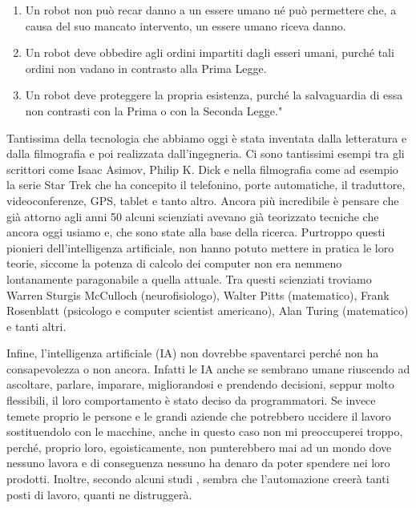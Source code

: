 \documentclass[12pt]{book} %
\begin{document}
\begin{enumerate}
\item Un robot non può recar danno a un essere umano né può permettere che, a causa del suo mancato intervento, un
essere umano riceva danno.
\item Un robot deve obbedire agli ordini impartiti dagli esseri umani, purché tali ordini non vadano in contrasto alla
Prima Legge.
\item Un robot deve proteggere la propria esistenza, purché la salvaguardia di essa non contrasti con la Prima o con la
Seconda Legge."
\end{enumerate}
Tantissima della tecnologia che abbiamo oggi è stata inventata dalla letteratura e dalla filmografia e poi realizzata
dall'ingegneria. Ci sono tantissimi esempi tra gli scrittori come Isaac Asimov, Philip K. Dick e
nella filmografia come ad esempio la serie Star Trek che ha concepito il telefonino, porte automatiche, il traduttore,
videoconferenze, GPS, tablet e tanto altro. Ancora più incredibile è pensare che già attorno agli anni 50 alcuni
scienziati avevano già teorizzato tecniche che ancora oggi usiamo e, che sono state alla base della ricerca. Purtroppo
questi pionieri dell'intelligenza artificiale, non hanno potuto mettere in pratica le loro teorie,
siccome la potenza di calcolo dei computer non era nemmeno lontanamente paragonabile a quella attuale. Tra questi
scienziati troviamo Warren Sturgis McCulloch (neurofisiologo), Walter Pitts (matematico), Frank Rosenblatt (psicologo
e computer scientist americano), Alan Turing (matematico) e tanti altri.

Infine, l'intelligenza artificiale (IA) non dovrebbe spaventarci perché non ha consapevolezza o non
ancora. Infatti le IA anche se sembrano umane riuscendo ad ascoltare, parlare, imparare, migliorandosi e prendendo
decisioni, seppur molto flessibili, il loro comportamento è stato deciso da programmatori.
Se invece temete proprio le persone e le grandi aziende che potrebbero uccidere il lavoro sostituendolo con le macchine, anche in questo caso non mi preoccuperei troppo, perché, proprio loro, egoisticamente, non punterebbero mai ad un mondo dove nessuno lavora e di conseguenza nessuno ha denaro da poter spendere nei loro prodotti. Inoltre, secondo alcuni studi , sembra che l'automazione creerà tanti posti di lavoro, quanti ne distruggerà.
\end{document}
